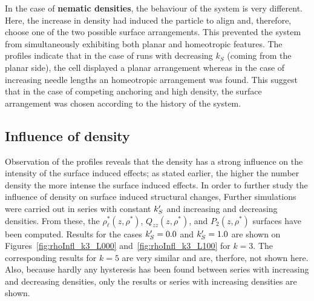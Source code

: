 In the case of \textbf{nematic densities}, the behaviour of the system is very different. Here,
the increase in density had induced the particle to align and, therefore, choose one of 
the two possible
surface arrangements. This prevented the system from simultaneously exhibiting both planar 
and homeotropic features. The profiles indicate that in the case of runs with decreasing $k_S$ 
(\ie coming from the planar side), the cell displayed a planar arrangement whereas in the case of
increasing needle lengths an homeotropic arrangement was found. This suggest that in the case of
competing anchoring and high density, the surface arrangement was chosen according to the history
of the system.



\subsection{Influence of density}
\label{ss:rhoInfl}

Observation of the profiles reveals that the density has a strong influence on the
intensity of the surface induced effects; as stated earlier, 
the higher the number density the more intense the surface induced effects. 
In order to further study the influence of density on surface induced structural changes,
Further simulations were carried out
in series with constant $k_S^{\prime}$ and increasing and decreasing densities. 
From these, the $\rho^{*}_\ell(z,\rho^{*})$, $Q_{zz}(z,\rho^{*})$, and $P_2(z,\rho^{*})$
surfaces have been computed. 
Results for the cases $k_S^{\prime} = 0.0$ and $k_S^{\prime} = 1.0$ are shown on Figures~\ref{fig:rhoInfl_k3_L000} 
and~\ref{fig:rhoInfl_k3_L100} for $k=3$. The corresponding results for $k=5$ 
are very similar  and are, therfore, not shown here. Also, because hardly any hysteresis has been found 
between series with increasing and decreasing densities, only the results or series with increasing 
densities are shown.

